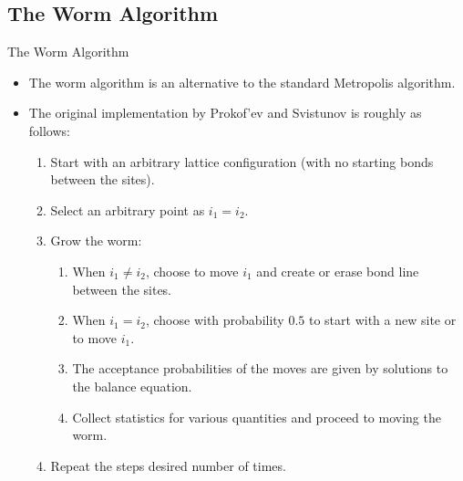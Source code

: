 \documentclass{beamer}
\begin{document}
\subsection{The Worm Algorithm}
\begin{frame}{The Worm Algorithm}
\begin{itemize}
    \item The worm algorithm is an alternative to the standard Metropolis algorithm.
    \item The original implementation by Prokof'ev and Svistunov is roughly as follows:
    \begin{enumerate}
        \item Start with an arbitrary lattice configuration (with no starting bonds between the sites).
        \item Select an arbitrary point as $i_1 = i_2$.
        \item Grow the worm:
        \begin{enumerate}
            \item When $i_1 \neq i_2$, choose to move $i_1$ and create or erase bond line between the sites.
            \item When $i_1 = i_2$, choose with probability $0.5$ to start with a new site or to move $i_1$.
            \item The acceptance probabilities of the moves are given by solutions to the balance equation.
            \item Collect statistics for various quantities and proceed to moving the worm.
        \end{enumerate}
        \item Repeat the steps desired number of times.
    \end{enumerate}
\end{itemize}
\end{frame}
\end{document}
